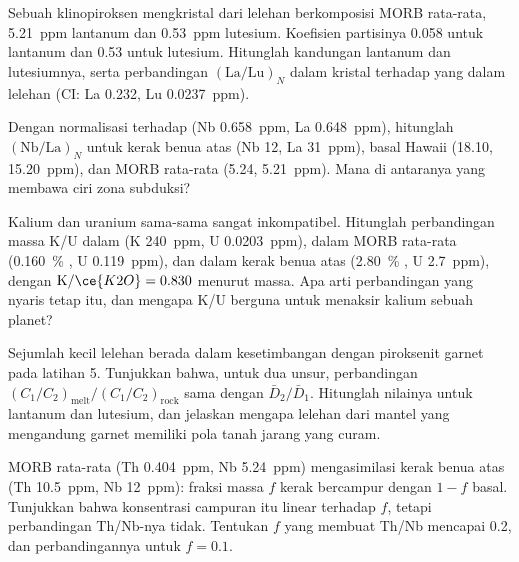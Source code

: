 \begin{exercise}[$\star\star$]\label{exo:b2:elements-in-the-earth:7}
Sebuah klinopiroksen mengkristal dari lelehan berkomposisi MORB rata-rata,
\qty{5.21}{ppm} lantanum dan \qty{0.53}{ppm} lutesium. Koefisien
partisinya 0.058 untuk lantanum dan 0.53 untuk lutesium. Hitunglah kandungan
lantanum dan lutesiumnya, serta perbandingan $(\mathrm{La}/\mathrm{Lu})_N$
dalam kristal terhadap yang dalam lelehan (CI: La 0.232, Lu \qty{0.0237}{ppm}).
\end{exercise}

\begin{exercise}[$\star\star$]\label{exo:b2:elements-in-the-earth:8}
Dengan normalisasi terhadap  (Nb \qty{0.658}{ppm}, La \qty{0.648}{ppm}),
hitunglah $(\mathrm{Nb}/\mathrm{La})_N$ untuk kerak benua atas (Nb 12,
La \qty{31}{ppm}), basal Hawaii (18.10, \qty{15.20}{ppm}), dan MORB rata-rata
(5.24, \qty{5.21}{ppm}). Mana di antaranya yang membawa ciri zona subduksi?
\end{exercise}

\begin{exercise}[$\star\star$]\label{exo:b2:elements-in-the-earth:9}
Kalium dan uranium sama-sama sangat inkompatibel. Hitunglah perbandingan massa K/U dalam
 (K \qty{240}{ppm}, U \qty{0.0203}{ppm}), dalam MORB rata-rata
(\qty{0.160}{\percent} , U \qty{0.119}{ppm}), dan dalam kerak benua
atas (\qty{2.80}{\percent} , U \qty{2.7}{ppm}), dengan
$\mathrm{K}/\ce{K2O} = 0.830$ menurut massa. Apa arti perbandingan yang nyaris tetap itu,
dan mengapa K/U berguna untuk menaksir kalium sebuah planet?
\end{exercise}

\begin{exercise}[$\star\star\star$]\label{exo:b2:elements-in-the-earth:10}
Sejumlah kecil lelehan berada dalam kesetimbangan dengan piroksenit garnet pada latihan
5. Tunjukkan bahwa, untuk dua unsur, perbandingan
$(C_1/C_2)_{\mathrm{melt}}/(C_1/C_2)_{\mathrm{rock}}$ sama dengan
$\bar D_2/\bar D_1$. Hitunglah nilainya untuk lantanum dan lutesium, dan jelaskan mengapa
lelehan dari mantel yang mengandung garnet memiliki pola tanah jarang yang curam.
\end{exercise}

\begin{exercise}[$\star\star\star$]\label{exo:b2:elements-in-the-earth:11}
MORB rata-rata (Th \qty{0.404}{ppm}, Nb \qty{5.24}{ppm}) mengasimilasi kerak benua
atas (Th \qty{10.5}{ppm}, Nb \qty{12}{ppm}): fraksi massa $f$
kerak bercampur dengan $1-f$ basal. Tunjukkan bahwa konsentrasi campuran itu
linear terhadap $f$, tetapi perbandingan Th/Nb-nya tidak. Tentukan $f$ yang membuat Th/Nb mencapai
0.2, dan perbandingannya untuk $f = 0.1$.
\end{exercise}

